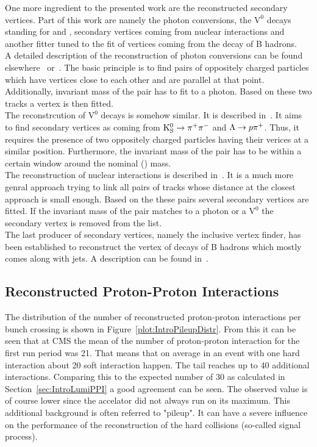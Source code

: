 One more ingredient to the presented work are the reconstructed secondary vertices. Part of this work are namely the photon conversions, the $\text{V}^{\text{0}}$ decays standing for \PKzS{} and \PgL{}, secondary vertices coming from nuclear interactions and another fitter tuned to the fit of vertices coming from the decay of B hadrons. \\
A detailed description of the reconstruction of photon conversions can be found elsewhere~\cite{GiordanoConversion} or~\cite{CMS-PAS-EGM-10-005}. The basic principle is to find pairs of oppositely charged particles which have vertices close to each other and are parallel at that point. Additionally, invariant mass of the pair has to fit to a photon. Based on these two tracks a vertex is then fitted. \\
The reconstrcution of $\text{V}^{\text{0}}$ decays is somehow similar. It is described in~. It aims to find secondary vertices as coming from $\mathrm{K}^0_\mathrm{S}{} \rightarrow{} \pi{}^{+}{}\pi{}^{-}{}$ and $\Lambda{}{} \rightarrow{} p\pi{}^{+}{}$. Thus, it requires the presence of two oppositely charged particles having their verices at a similar position. Furthermore, the invariant mass of the pair has to be within a certain window around the nominal \PKzS{} (\PgL{}) mass. \\
The reconstruction of nuclear interactions is described in~. It is a much more genral approach trying to link all pairs of tracks whose distance at the closest approach is small enough.  Based on the these pairs several secondary vertices are fitted. If the invariant mass of the pair matches to a photon or a $\text{V}^{\text{0}}$ the secondary vertex is removed from the list. \\
The last producer of secondary vertices, namely the inclusive vertex finder, has been established to reconstruct the vertex of decays of B hadrons which mostly comes along with jets. A description can be found in~.


\subsection{Reconstructed Proton-Proton Interactions}

The distribution of the number of reconstructed proton-proton interactions per bunch crossing is shown in Figure~\ref{plot:IntroPileupDistr}. From this it can be seen that at CMS the mean of the number of proton-proton interaction for the first run period was 21. That means that on average in an event with one hard interaction about 20 soft interaction happen. The tail reaches up to 40 additional interactions. Comparing this to the expected number of 30 as calculated in Section~\ref{sec:IntroLumiPPI} a good agreement can be seen. The observed value is of course lower since the accelator did not always run on its maximum. This additional background is often referred to "pileup". It can have a severe influence on the performance of the reconstruction of the hard collisions (so-called signal process).


